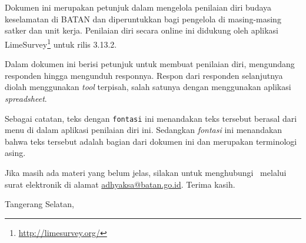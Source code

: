 \chapter*{\kataPengantar}
Dokumen ini merupakan petunjuk dalam mengelola penilaian diri budaya keselamatan di BATAN dan diperuntukkan bagi pengelola di masing-masing satker dan unit kerja. Penilaian diri secara online ini didukung oleh aplikasi LimeSurvey\footnote{\url{http://limesurvey.org/}} untuk rilis 3.13.2.

Dalam dokumen ini berisi petunjuk untuk membuat penilaian diri, mengundang responden hingga mengunduh responnya. Respon dari responden selanjutnya diolah menggunakan \textit{tool} terpisah, salah satunya dengan menggunakan aplikasi \textit{spreadsheet}.

Sebagai catatan, teks dengan \texttt{fontasi} ini menandakan teks tersebut berasal dari menu di dalam aplikasi penilaian diri ini. Sedangkan \textit{fontasi} ini menandakan bahwa teks tersebut adalah bagian dari dokumen ini dan merupakan terminologi asing.

Jika masih ada materi yang belum jelas, silakan untuk menghubungi \saya~melalui surat elektronik di alamat \href{mailto:adhyaksa@batan.go.id}{adhyaksa@batan.go.id}. Terima kasih.

\vspace*{0.1cm}
\begin{flushright}
Tangerang Selatan, \bulanTahun \\[0.1cm]
\vspace*{1cm}
\penulis

\end{flushright}
